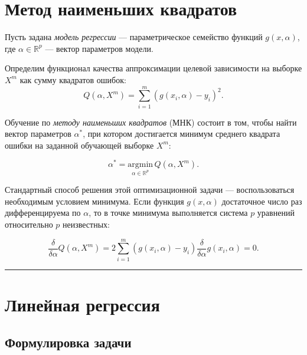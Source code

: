 \documentclass[11pt,a4paper]{article}
\begin{document}
    \hypertarget{ux43cux435ux442ux43eux434-ux43dux430ux438ux43cux435ux43dux44cux448ux438ux445-ux43aux432ux430ux434ux440ux430ux442ux43eux432}{%
\section{Метод наименьших
квадратов}\label{ux43cux435ux442ux43eux434-ux43dux430ux438ux43cux435ux43dux44cux448ux438ux445-ux43aux432ux430ux434ux440ux430ux442ux43eux432}}

Пусть задана \emph{модель регрессии} --- параметрическое семейство
функций \(g(x,\alpha)\), где \(\alpha \in \mathbb{R}^p\) --- вектор
параметров модели.

Определим функционал качества аппроксимации целевой зависимости на
выборке \(X^m\) как сумму квадратов ошибок:
\[ Q(\alpha, X^m) = \sum_{i=1}^m \left( g(x_i, \alpha) - y_i \right)^2. \]

Обучение по \emph{методу наименьших квадратов} (МНК) состоит в том,
чтобы найти вектор параметров \(\alpha^*\), при котором достигается
минимум среднего квадрата ошибки на заданной обучающей выборке \(X^m\):

\[ \alpha^* = \underset{\alpha \in \mathbb{R}^p}{\mathrm{argmin}} \, {Q(\alpha, X^m)}. \]

Стандартный способ решения этой оптимизационной задачи ---
воспользоваться необходимым условием минимума. Если функция
\(g(x, \alpha)\) достаточное число раз дифференцируема по \(\alpha\), то
в точке минимума выполняется система \(p\) уравнений относительно \(p\)
неизвестных:

\[ \frac{\delta}{\delta \alpha} Q(\alpha, X^m) = 2 \sum_{i=1}^{m} \left( g(x_i, \alpha) -y_i \right) \frac{\delta}{\delta \alpha} g(x_i, \alpha) = 0. \]

    \begin{center}\rule{0.5\linewidth}{0.5pt}\end{center}

    \hypertarget{ux43bux438ux43dux435ux439ux43dux430ux44f-ux440ux435ux433ux440ux435ux441ux441ux438ux44f}{%
\section{Линейная
регрессия}\label{ux43bux438ux43dux435ux439ux43dux430ux44f-ux440ux435ux433ux440ux435ux441ux441ux438ux44f}}

\hypertarget{ux444ux43eux440ux43cux443ux43bux438ux440ux43eux432ux43aux430-ux437ux430ux434ux430ux447ux438}{%
\subsection{Формулировка
задачи}\label{ux444ux43eux440ux43cux443ux43bux438ux440ux43eux432ux43aux430-ux437ux430ux434ux430ux447ux438}}
\end{document}
